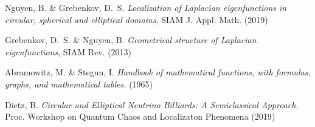\documentclass[a4paper,10pt]{article}
\begin{document}
\vspace{-1.5em}
\renewcommand{\refname}{\normalsize Références}
%
\begin{thebibliography}{99}
\vspace{-1em}
{\scriptsize
%
%
	Nguyen, B. \& Grebenkov, D.~S.
	{\it Localization of Laplacian eigenfunctions in circular, spherical
	and elliptical domains}, SIAM J.  Appl. Math. (2019)

	Grebenkov, D.~S.  \& Nguyen, B.
	{\it Geometrical structure of Laplacian eigenfunctions},
	SIAM Rev. (2013)

 Abramowitz, M. \& Stegun, I.
	{\it Handbook of mathematical functions, with
	formulas, graphs, and mathematical tables.} (1965)

	Dietz, B.
	{\it Circular and Elliptical Neutrino Billiards:
	A Semiclassical Approach.}
	Proc. Workshop on Quantum Chaos and Localizaton Phenomena (2019)

%
%
}
\end{thebibliography}
\end{document}
